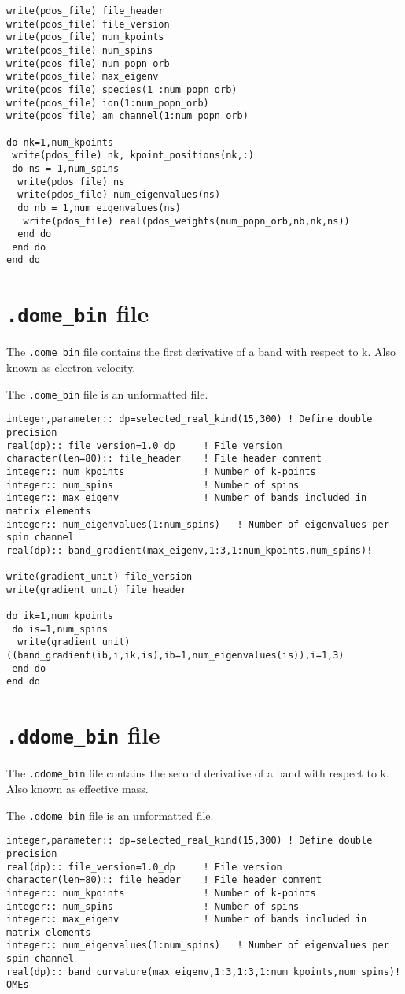 \documentclass[a4paper,11pt,twoside]{book}
\begin{document}
\begin{appendix}
\begin{verbatim}
write(pdos_file) file_header
write(pdos_file) file_version
write(pdos_file) num_kpoints
write(pdos_file) num_spins
write(pdos_file) num_popn_orb
write(pdos_file) max_eigenv
write(pdos_file) species(1_:num_popn_orb)
write(pdos_file) ion(1:num_popn_orb)
write(pdos_file) am_channel(1:num_popn_orb)

do nk=1,num_kpoints
 write(pdos_file) nk, kpoint_positions(nk,:)
 do ns = 1,num_spins
  write(pdos_file) ns
  write(pdos_file) num_eigenvalues(ns)
  do nb = 1,num_eigenvalues(ns)
   write(pdos_file) real(pdos_weights(num_popn_orb,nb,nk,ns))
  end do
 end do
end do
\end{verbatim}

\section{\texttt{.dome\_bin} file}
The \texttt{.dome\_bin} file contains the first derivative of a band with respect to k. Also known as electron velocity.

The \texttt{.dome\_bin} file is an unformatted file.
\begin{verbatim}
integer,parameter:: dp=selected_real_kind(15,300) ! Define double precision
real(dp):: file_version=1.0_dp     ! File version
character(len=80):: file_header    ! File header comment
integer:: num_kpoints              ! Number of k-points
integer:: num_spins                ! Number of spins
integer:: max_eigenv               ! Number of bands included in matrix elements
integer:: num_eigenvalues(1:num_spins)   ! Number of eigenvalues per spin channel
real(dp):: band_gradient(max_eigenv,1:3,1:num_kpoints,num_spins)!

write(gradient_unit) file_version
write(gradient_unit) file_header

do ik=1,num_kpoints
 do is=1,num_spins
  write(gradient_unit) ((band_gradient(ib,i,ik,is),ib=1,num_eigenvalues(is)),i=1,3)
 end do
end do
\end{verbatim}

\section{\texttt{.ddome\_bin} file}
The \texttt{.ddome\_bin} file contains the second derivative of a band with respect to k. Also known as effective mass.

The \texttt{.ddome\_bin} file is an unformatted file.
\begin{verbatim}
integer,parameter:: dp=selected_real_kind(15,300) ! Define double precision
real(dp):: file_version=1.0_dp     ! File version
character(len=80):: file_header    ! File header comment
integer:: num_kpoints              ! Number of k-points
integer:: num_spins                ! Number of spins
integer:: max_eigenv               ! Number of bands included in matrix elements
integer:: num_eigenvalues(1:num_spins)   ! Number of eigenvalues per spin channel
real(dp):: band_curvature(max_eigenv,1:3,1:3,1:num_kpoints,num_spins)! OMEs


\end{verbatim}
\end{appendix}
\end{document}
